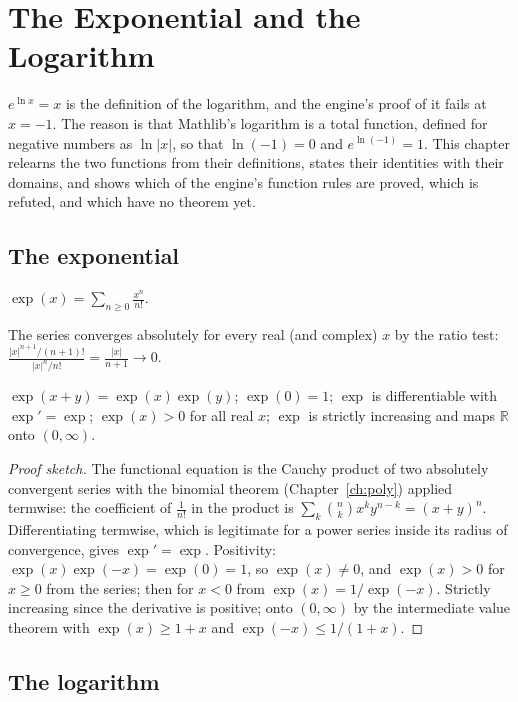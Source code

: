 \chapter{The Exponential and the Logarithm}\label{ch:explog}

$e^{\ln x} = x$ is the definition of the logarithm, and the engine's proof of it fails at
$x = -1$. The reason is that Mathlib's logarithm is a total function, defined for negative numbers
as $\ln |x|$, so that $\ln(-1) = 0$ and $e^{\ln(-1)} = 1$. This chapter relearns the two functions
from their definitions, states their identities with their domains, and shows which of the
engine's function rules are proved, which is refuted, and which have no theorem yet.

\section{The exponential}

\begin{definition}
  $\exp(x) = \sum_{n \ge 0} \frac{x^n}{n!}$.
\end{definition}

The series converges absolutely for every real (and complex) $x$ by the ratio test:
$\frac{|x|^{n+1}/(n+1)!}{|x|^n/n!} = \frac{|x|}{n+1} \to 0$.

\begin{theorem}
  $\exp(x + y) = \exp(x)\exp(y)$; $\exp(0) = 1$; $\exp$ is differentiable with $\exp' = \exp$;
  $\exp(x) > 0$ for all real $x$; $\exp$ is strictly increasing and maps $\mathbb{R}$ onto
  $(0, \infty)$.
\end{theorem}
\begin{proof}[Proof sketch]
  The functional equation is the Cauchy product of two absolutely convergent series with the
  binomial theorem (Chapter~\ref{ch:poly}) applied termwise: the coefficient of $\frac{1}{n!}$ in
  the product is $\sum_k \binom{n}{k} x^k y^{n-k} = (x+y)^n$. Differentiating termwise, which is
  legitimate for a power series inside its radius of convergence, gives $\exp' = \exp$.
  Positivity: $\exp(x)\exp(-x) = \exp(0) = 1$, so $\exp(x) \neq 0$, and $\exp(x) > 0$ for
  $x \ge 0$ from the series; then for $x < 0$ from $\exp(x) = 1/\exp(-x)$. Strictly increasing
  since the derivative is positive; onto $(0, \infty)$ by the intermediate value theorem with
  $\exp(x) \ge 1 + x$ and $\exp(-x) \le 1/(1+x)$.
\end{proof}

\section{The logarithm}

